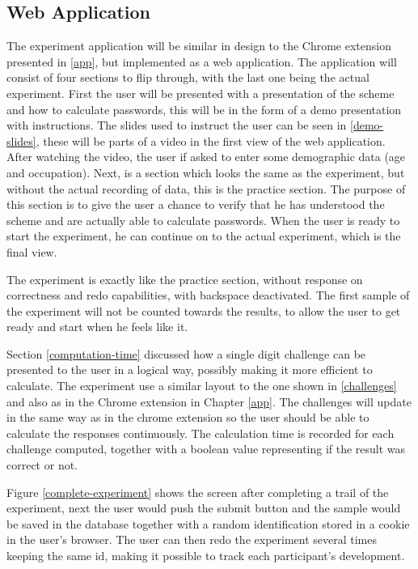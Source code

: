 \subsection{Web Application}
The experiment application will be similar in design to the Chrome extension presented in \autoref{app}, but implemented as a web application. The application will consist of four sections to flip through, with the last one being the actual experiment.  First the user will be presented with a presentation of the scheme and how to calculate passwords, this will be in the form of a demo presentation with instructions. The slides used to instruct the user can be seen in \autoref{demo-slides}, these will be parts of a video in the first view of the web application. After watching the video, the user if asked to enter some demographic data (age and occupation). Next, is a section which looks the same as the experiment, but without the actual recording of data, this is the practice section. The purpose of this section is to give the user a chance to verify that he has understood the scheme and are actually able to calculate passwords. When the user is ready to start the experiment, he can continue on to the actual experiment, which is the final view. 

\par The experiment is exactly like the practice section, without response on correctness and redo capabilities, with backspace deactivated. The first sample of the experiment will not be counted towards the results, to allow the user to get ready and start when he feels like it. 
\par Section \ref{computation-time} discussed how a single digit challenge can be presented to the user in a logical way, possibly making it more efficient to calculate. The experiment use a similar layout to the one shown in \autoref{challenges} and also as in the Chrome extension in Chapter \ref{app}. The challenges will update in the same way as in the chrome extension so the user should be able to calculate the responses continuously. The calculation time is recorded for each challenge computed, together with a boolean value representing if the result was correct or not. 
\par Figure \ref{complete-experiment} shows the screen after completing a trail of the experiment, next the user would push the submit button and the sample would be saved in the database together with a random identification stored in a cookie in the user's browser. The user can then redo the experiment several times keeping the same id, making it possible to track each participant's development.

